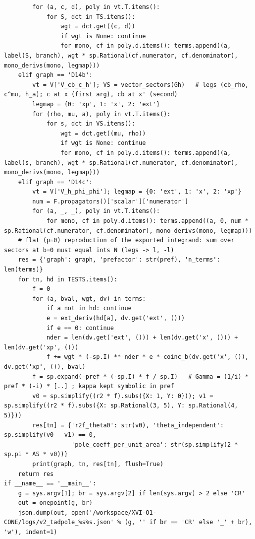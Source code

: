 \documentclass[10pt]{article}
\begin{document}
\begin{lstlisting}
        for (a, c, d), poly in vt.T.items():
            for S, dct in TS.items():
                wgt = dct.get((c, d))
                if wgt is None: continue
                for mono, cf in poly.d.items(): terms.append((a, label(S, branch), wgt * sp.Rational(cf.numerator, cf.denominator), mono_derivs(mono, legmap)))
    elif graph == 'D14b':
        vt = V['V_cb_c_h']; VS = vector_sectors(Gh)   # legs (cb_rho, c^mu, h_a); c at x (first arg), cb at x' (second)
        legmap = {0: 'xp', 1: 'x', 2: 'ext'}
        for (rho, mu, a), poly in vt.T.items():
            for s, dct in VS.items():
                wgt = dct.get((mu, rho))
                if wgt is None: continue
                for mono, cf in poly.d.items(): terms.append((a, label(s, branch), wgt * sp.Rational(cf.numerator, cf.denominator), mono_derivs(mono, legmap)))
    elif graph == 'D14c':
        vt = V['V_h_phi_phi']; legmap = {0: 'ext', 1: 'x', 2: 'xp'}
        num = F.propagators()['scalar']['numerator']
        for (a, _, _), poly in vt.T.items():
            for mono, cf in poly.d.items(): terms.append((a, 0, num * sp.Rational(cf.numerator, cf.denominator), mono_derivs(mono, legmap)))
    # flat (p=0) reproduction of the exported integrand: sum over sectors at b=0 must equal ints N (legs -> l, -l)
    res = {'graph': graph, 'prefactor': str(pref), 'n_terms': len(terms)}
    for tn, hd in TESTS.items():
        f = 0
        for (a, bval, wgt, dv) in terms:
            if a not in hd: continue
            e = ext_deriv(hd[a], dv.get('ext', ()))
            if e == 0: continue
            nder = len(dv.get('ext', ())) + len(dv.get('x', ())) + len(dv.get('xp', ()))
            f += wgt * (-sp.I) ** nder * e * coinc_b(dv.get('x', ()), dv.get('xp', ()), bval)
        f = sp.expand(-pref * (-sp.I) * f / sp.I)   # Gamma = (1/i) * pref * (-i) * [..] ; kappa kept symbolic in pref
        v0 = sp.simplify((r2 * f).subs({X: 1, Y: 0})); v1 = sp.simplify((r2 * f).subs({X: sp.Rational(3, 5), Y: sp.Rational(4, 5)}))
        res[tn] = {'r2f_theta0': str(v0), 'theta_independent': sp.simplify(v0 - v1) == 0,
                   'pole_coeff_per_unit_area': str(sp.simplify(2 * sp.pi * AS * v0))}
        print(graph, tn, res[tn], flush=True)
    return res
if __name__ == '__main__':
    g = sys.argv[1]; br = sys.argv[2] if len(sys.argv) > 2 else 'CR'
    out = onepoint(g, br)
    json.dump(out, open('/workspace/XVI-O1-CONE/logs/v2_tadpole_%s%s.json' % (g, '' if br == 'CR' else '_' + br), 'w'), indent=1)
\end{lstlisting}
\end{document}
